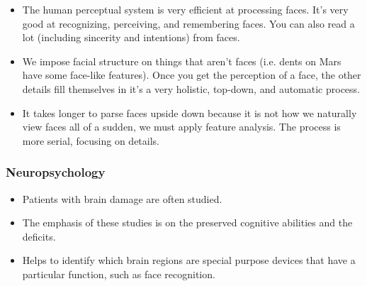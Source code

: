 \documentclass[]{article}
\begin{document}
\begin{itemize}
					\item The human perceptual system is very efficient at processing faces. It's very good at recognizing, perceiving, and remembering faces. You can also read a lot (including sincerity and intentions) from faces.
					\item We impose facial structure on things that aren't faces (i.e. dents on Mars have some face-like features). Once you get the perception of a face, the other details fill themselves in \textendash{} it's a very holistic, top-down, and automatic process.
					\item It takes longer to parse faces upside down because it is not how we naturally view faces \textendash{} all of a sudden, we must apply feature analysis. The process is more serial, focusing on details.
				\end{itemize}

			\subsubsection{Neuropsychology}
				\begin{itemize}
					\item Patients with brain damage are often studied.
					\item The emphasis of these studies is on the preserved cognitive abilities and the deficits.
					\item Helps to identify which brain regions are special purpose devices that have a particular function, such as face recognition.
				\end{itemize}
\end{document}
